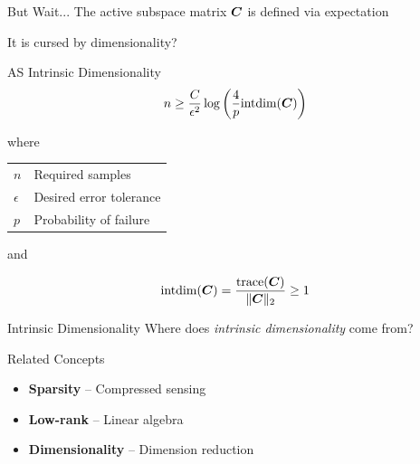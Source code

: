 \documentclass[14pt]{beamer}
\begin{document}
\begin{frame}{But Wait...}
  The active subspace matrix $\boldsymbol{C}$ is defined via expectation

  \bigskip It is cursed by dimensionality?
\end{frame}

\begin{frame}{AS Intrinsic Dimensionality}
  \begin{equation*}
    n \geq \frac{C}{\epsilon^2}\log\left(\frac{4}{p}\text{intdim}(\boldsymbol{C})\right)
  \end{equation*}

  where

  \begin{table}
    \centering
    \begin{tabular}{@{}ll@{}}
      $n$ & Required samples \\
      $\epsilon$ & Desired error tolerance \\
      $p$ & Probability of failure
    \end{tabular}
  \end{table}

  and

  \begin{equation*}
    \text{intdim}(\boldsymbol{C}) = \frac{\text{trace}(\boldsymbol{C})}{\|\boldsymbol{C}\|_2} \geq 1
  \end{equation*}

\end{frame}

\begin{frame}{Intrinsic Dimensionality}
  \huge Where does \emph{intrinsic dimensionality} come from?
\end{frame}

\begin{frame}{Related Concepts}
  \begin{itemize}
  \item \textbf{Sparsity} -- Compressed sensing
  \item \textbf{Low-rank} -- Linear algebra
  \item \textbf{Dimensionality} -- Dimension reduction
  \end{itemize}
\end{frame}
\end{document}
